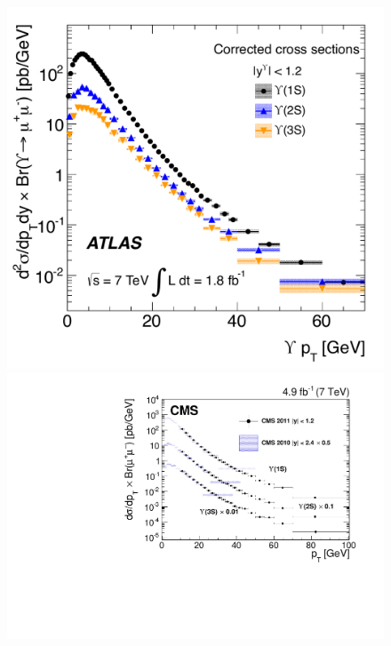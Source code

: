 \begin{figure}[h]
\begin{center}
 \hspace{0.5cm} \includegraphics[height=0.25\textheight]{Chapters/pQuarkonia/AtlasUpsiPtNude.pdf}
  \includegraphics[height=0.25\textheight]{Chapters/pQuarkonia/CMSUpsiPt.pdf}

\end{center}
\end{figure}
